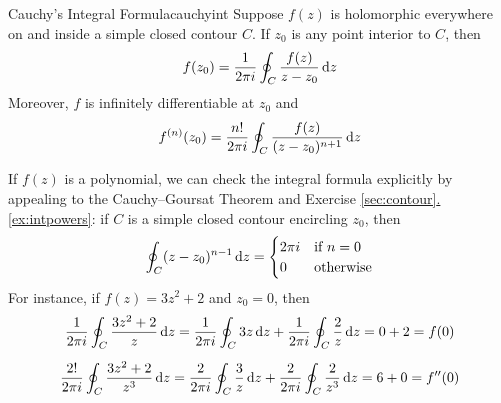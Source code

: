 \vfil\goodbreak



\begin{thm}{Cauchy's Integral Formula}{cauchyint}
Suppose $f(z)$ is holomorphic everywhere on and inside a simple closed contour $C$. If $z_0$ is any point interior to $C$, then
\[f(z_0)=\frac 1{2\pi i}\oint_C\frac{f(z)}{z-z_0}\,{\mathrm{d} z}\]
Moreover, $f$ is infinitely differentiable at $z_0$ and
\[f^{(n)}(z_0)=\frac{n!}{2\pi i}\oint_C\frac{f(z)}{(z-z_0)^{n+1}}\,{\mathrm{d} z}\]
\end{thm}

\begin{example}{}{}
If $f(z)$ is a polynomial, we can check the integral formula explicitly by appealing to the Cauchy--Goursat Theorem and Exercise \hyperref[ex:intpowers]{\ref*{sec:contour}.\ref*{ex:intpowers}}: if $C$ is a simple closed contour encircling $z_0$, then 
  \[\oint_C(z-z_0)^{n-1}\,{\mathrm{d} z}=\begin{cases}
  2\pi i&\text{if }n=0\\
  0&\text{otherwise}
  \end{cases}\]
  For instance, if $f(z)=3z^2+2$ and $z_0=0$, then
  \begin{gather*}
  \frac 1{2\pi i}\oint_C\frac{3z^2+2}{z}\,{\mathrm{d} z}=\frac 1{2\pi i}\oint_C3z\,{\mathrm{d} z}+\frac 1{2\pi i}\oint_C\frac{2}{z}\,{\mathrm{d} z} =0+2=f(0)\\[5pt]
  \frac{2!}{2\pi i}\oint_C\frac{3z^2+2}{z^3}\,{\mathrm{d} z}=\frac 2{2\pi i}\oint_C\frac 3z\,{\mathrm{d} z}+\frac 2{2\pi i}\oint_C\frac{2}{z^3}\,{\mathrm{d} z} =6+0=f''(0)
  \end{gather*}
\end{example}


